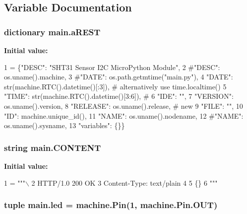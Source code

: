 \subsection{Variable Documentation}
\hypertarget{namespacemain_ae45e77e713b3c943659056426e077b4c}{
\subsubsection[{a\-R\-E\-S\-T}]{\setlength{\rightskip}{0pt plus 5cm}dictionary main.\-a\-R\-E\-S\-T}}\label{namespacemain_ae45e77e713b3c943659056426e077b4c}
{\bfseries Initial value\-:}
\begin{DoxyCode}
1 = \{\textcolor{stringliteral}{"DESC"}: \textcolor{stringliteral}{"SHT31 Sensor I2C MicroPython Module"},
2          \textcolor{comment}{#"DESC": os.uname().machine,}
3          \textcolor{comment}{#"DATE": os.path.getmtime("main.py"),}
4          \textcolor{stringliteral}{"DATE"}: str(machine.RTC().datetime()[:3]),   \textcolor{comment}{# alternatively use time.localtime()}
5          \textcolor{stringliteral}{"TIME"}: str(machine.RTC().datetime()[3:6]),  \textcolor{comment}{#}
6          \textcolor{stringliteral}{"IDE"}: \textcolor{stringliteral}{""},
7          \textcolor{stringliteral}{"VERSION"}: os.uname().version,
8          \textcolor{stringliteral}{"RELEASE"}: os.uname().release,               \textcolor{comment}{# new}
9          \textcolor{stringliteral}{"FILE"}: \textcolor{stringliteral}{""},
10          \textcolor{stringliteral}{"ID"}: machine.unique\_id(),
11          \textcolor{stringliteral}{"NAME"}: os.uname().nodename,
12          \textcolor{comment}{#"NAME": os.uname().sysname,}
13          \textcolor{stringliteral}{"variables"}: \{\}\}
\end{DoxyCode}
\hypertarget{namespacemain_a9f1b66682ed213ee4114be73ecccc969}{
\subsubsection[{C\-O\-N\-T\-E\-N\-T}]{\setlength{\rightskip}{0pt plus 5cm}string main.\-C\-O\-N\-T\-E\-N\-T}}\label{namespacemain_a9f1b66682ed213ee4114be73ecccc969}
{\bfseries Initial value\-:}
\begin{DoxyCode}
1 = \textcolor{stringliteral}{"""\(\backslash\)}
2 \textcolor{stringliteral}{HTTP/1.0 200 OK}
3 \textcolor{stringliteral}{Content-Type: text/plain}
4 \textcolor{stringliteral}{}
5 \textcolor{stringliteral}{\{\}}
6 \textcolor{stringliteral}{"""}
\end{DoxyCode}
\hypertarget{namespacemain_afa42c8222ef34c64505913e2c20ca278}{
\subsubsection[{led}]{\setlength{\rightskip}{0pt plus 5cm}tuple main.\-led = machine.\-Pin(1, machine.\-Pin.\-O\-U\-T)}}\label{namespacemain_afa42c8222ef34c64505913e2c20ca278}
